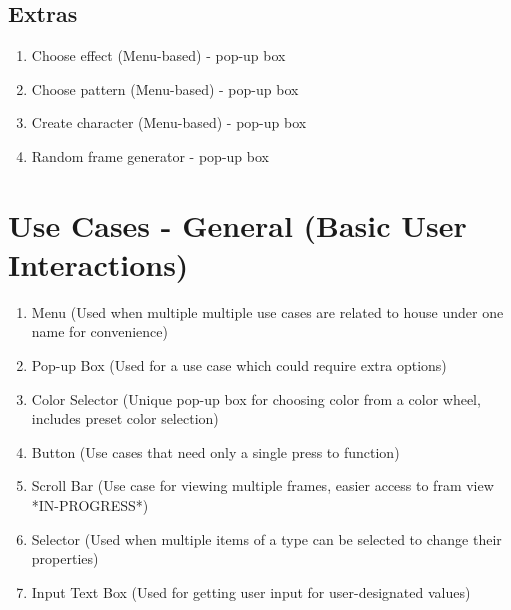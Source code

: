 \documentclass[12pt,a4paper]{article}
\begin{document}
\subsection*{Extras}

\begin{enumerate}
	\item Choose effect (Menu-based) - pop-up box
	\item Choose pattern (Menu-based) - pop-up box
	\item Create character (Menu-based) - pop-up box
	\item Random frame generator - pop-up box
\end{enumerate}

\section*{Use Cases - General (Basic User Interactions)}

\begin{enumerate}
	\item Menu (Used when multiple multiple use cases are related to house under one name for convenience)
	\item Pop-up Box (Used for a use case which could require extra options)
	\item Color Selector (Unique pop-up box for choosing color from a color wheel, includes preset color selection)
	\item Button (Use cases that need only a single press to function)
	\item Scroll Bar (Use case for viewing multiple frames, easier access to fram view *IN-PROGRESS*)
	\item Selector (Used when multiple items of a type can be selected to change their properties)
	\item Input Text Box (Used for getting user input for user-designated values)
\end{enumerate}
\end{document}
